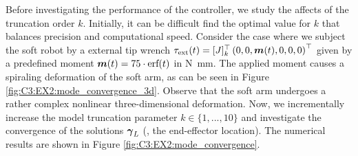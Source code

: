 \begin{example}
 Before investigating the performance of the controller, we study the affects of the truncation order $k$. Initially, it can be difficult find the optimal value for $k$ that balances precision and computational speed. Consider the case where we subject the soft robot by a external tip wrench $\tau_\textrm{ext}(t) = [J]_k^\top \left(0,0,{\boldsymbol{m}}(t),0,0,0 \right)^\top$ given by a predefined moment ${\boldsymbol{m}}(t) = 75 \cdot \textrm{erf}(t)$ in \si{\newton \milli \meter}. The applied moment causes a spiraling deformation of the soft arm, as can be seen in Figure \ref{fig:C3:EX2:mode_convergence_3d}. Observe that the soft arm undergoes a rather complex nonlinear three-dimensional deformation. Now, we incrementally increase the model truncation parameter $k \in \{1,...,10\}$ and investigate the convergence of the solutions ${\boldsymbol{\gamma}}_L$ (\ie, the end-effector location). The numerical results are shown in Figure \ref{fig:C3:EX2:mode_convergence}. 
 

\end{example}
